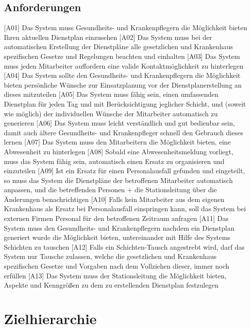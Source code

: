 \documentclass[10pt,a4paper]{article}
\begin{document}
\subsection{Anforderungen}
[A01] Das System muss Gesundheits- und Krankenpflegern die Möglichkeit bieten Ihren aktuellen Dienstplan einzusehen
[A02] Das System muss bei der automatischen Erstellung der Dienstpläne alle gesetzlichen und Krankenhaus spezifischen Gesetze und Regelungen beachten und einhalten
[A03] Das System muss jeden Mitarbeiter auffordern eine valide Kontaktmöglichkeit zu hinterlegen
[A04] Das System sollte den Gesundheits- und Krankenpflegern die Möglichkeit bieten persönliche Wünsche zur Einsatzplanung vor der Dienstplanerstellung an dieses mitzuteilen
[A05] Das System muss fähig sein, einen umfassenden Dienstplan für jeden Tag und mit Berücksichtigung jeglicher Schicht, und (soweit wie möglich) der individuellen Wünsche der Mitarbeiter automatisch zu generieren
[A06] Das System muss leicht verständlich und gut bedienbar sein, damit auch ältere Gesundheits- und Krankenpfleger schnell den Gebrauch dieses lernen
[A07] Das System muss den Mitarbeitern die Möglichkeit bieten, eine Abwesenheit zu hinterlegen
[A08] Sobald eine Abwesenheitsmeldung vorliegt, muss das System fähig sein, automatisch einen Ersatz zu organisieren und einzuteilen
[A09] Ist ein Ersatz für einen Personalausfall gefunden und eingeteilt, so muss das System die Dienstpläne der betroffenen Mitarbeiter automatisch anpassen, und die betreffenden Personen + die Stationsleitung über die Änderungen benachrichtigen
[A10] Falls kein Mitarbeiter aus dem eigenen Krankenhaus als Ersatz bei Personalausfall einspringen kann, soll das System bei externen Firmen Personal für den betroffenen Zeitraum anfragen
[A11] Das System muss den Gesundheits- und Krankenpflegern nachdem ein Dienstplan generiert wurde die Möglichkeit bieten, untereinander mit Hilfe des Systems Schichten zu tauschen
[A12] Falls ein Schichten-Tausch angestrebt wird, darf das System nur Tausche zulassen, welche die gesetzlichen und Krankenhaus spezifischen Gesetze und Vorgaben nach dem Vollziehen dieser, immer noch erfüllen
[A13] Das System muss der Stationsleitung die Möglichkeit bieten, Aspekte und Kenngrößen zu dem zu erstellenden Dienstplan festzulegen 
\section{Zielhierarchie}
\end{document}
